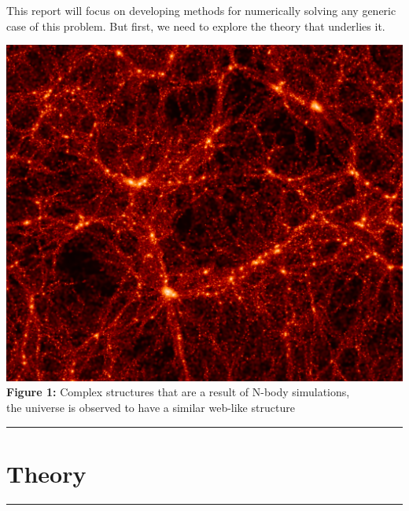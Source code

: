 \documentclass[11pt]{article}
\newcommand{\psection}[1]{{
    \begin{center}
        \noindent \rule{17cm}{0.4pt}
        \section*{\LARGE #1}
        \noindent \rule{17cm}{0.4pt}
    \end{center}
}}
\begin{document}
    This report will focus on developing methods for numerically solving any generic case of this problem. But first, we need to explore the theory that underlies it.
    \vspace{30pt}
    \begin{center}
        \includegraphics[scale = 0.3]{images/LCDM}
        \\ \caption{\textbf{Figure 1:} Complex structures that are a result of N-body simulations, \\the universe is observed to have a similar web-like structure}
        \label{fig:fig1}
    \end{center}
    
    
    \newpage
    
    \psection{Theory}
\end{document}
